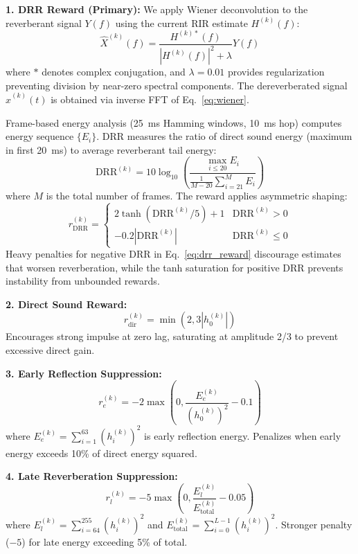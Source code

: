 \documentclass[12pt,a4paper]{article}
\begin{document}
\textbf{1. DRR Reward (Primary):} We apply Wiener deconvolution to the reverberant signal $Y(f)$ using the current RIR estimate $H^{(k)}(f)$:
\begin{equation}
\hat{X}^{(k)}(f) = \frac{H^{(k)*}(f)}{|H^{(k)}(f)|^2 + \lambda} Y(f)
\label{eq:wiener}
\end{equation}
where $*$ denotes complex conjugation, and $\lambda=0.01$ provides regularization preventing division by near-zero spectral components. The dereverberated signal $\hat{x}^{(k)}(t)$ is obtained via inverse FFT of Eq.~\eqref{eq:wiener}.

Frame-based energy analysis (25~ms Hamming windows, 10~ms hop) computes energy sequence $\{E_i\}$. DRR measures the ratio of direct sound energy (maximum in first 20~ms) to average reverberant tail energy:
\begin{equation}
\text{DRR}^{(k)} = 10\log_{10}\left(\frac{\max_{i \leq 20} E_i}{\frac{1}{M-20}\sum_{i=21}^{M} E_i}\right)
\label{eq:drr}
\end{equation}
where $M$ is the total number of frames. The reward applies asymmetric shaping:
\begin{equation}
r_{\text{DRR}}^{(k)} = \begin{cases}
2\tanh(\text{DRR}^{(k)}/5) + 1 & \text{DRR}^{(k)} > 0 \\
-0.2|\text{DRR}^{(k)}| & \text{DRR}^{(k)} \leq 0
\end{cases}
\label{eq:drr_reward}
\end{equation}
Heavy penalties for negative DRR in Eq.~\eqref{eq:drr_reward} discourage estimates that worsen reverberation, while the tanh saturation for positive DRR prevents instability from unbounded rewards.

\textbf{2. Direct Sound Reward:}
\begin{equation}
r_{\text{dir}}^{(k)} = \min(2, 3|h_0^{(k)}|)
\label{eq:direct_reward}
\end{equation}
Encourages strong impulse at zero lag, saturating at amplitude 2/3 to prevent excessive direct gain.

\textbf{3. Early Reflection Suppression:}
\begin{equation}
r_e^{(k)} = -2\max\left(0, \frac{E_e^{(k)}}{(h_0^{(k)})^2} - 0.1\right)
\label{eq:early_reward}
\end{equation}
where $E_e^{(k)} = \sum_{i=1}^{63} (h_i^{(k)})^2$ is early reflection energy. Penalizes when early energy exceeds 10\% of direct energy squared.

\textbf{4. Late Reverberation Suppression:}
\begin{equation}
r_l^{(k)} = -5\max\left(0, \frac{E_l^{(k)}}{E_{\text{total}}^{(k)}} - 0.05\right)
\label{eq:late_reward}
\end{equation}
where $E_l^{(k)} = \sum_{i=64}^{255} (h_i^{(k)})^2$ and $E_{\text{total}}^{(k)} = \sum_{i=0}^{L-1} (h_i^{(k)})^2$. Stronger penalty ($-5$) for late energy exceeding 5\% of total.
\end{document}
